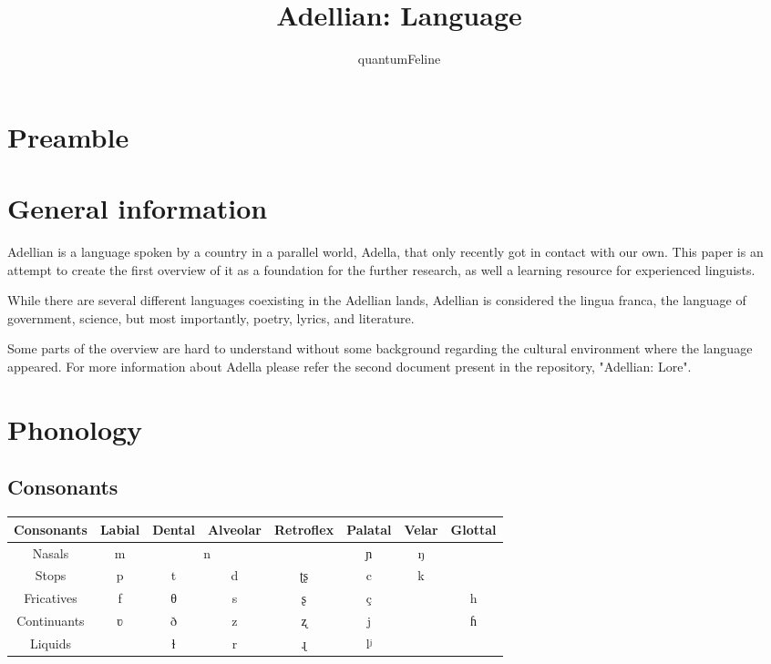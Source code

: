 \documentclass[12pt]{article}
\begin{document}
	\title{Adellian: Language}
	\author{quantumFeline}
	\maketitle

	\section{Preamble}

	\tableofcontents

	\section{General information}
	
	Adellian is a language spoken by a country in a parallel world, Adella, that only recently got in contact with our own. This paper is an attempt to create the first overview of it as a foundation for the further research, as well a learning resource for experienced linguists. 
	
	While there are several different languages coexisting in the Adellian lands, Adellian is considered the lingua franca, the language of government, science, but most importantly, poetry, lyrics, and literature.
	
	Some parts of the overview are hard to understand without some background regarding the cultural environment where the language appeared. For more information about Adella please refer the second document present in the repository, "Adellian: Lore".

	\section{Phonology}

	\subsection{Consonants}

	\begin{tabular}{||c | c c c c c c c||}
		\hline
		Consonants & Labial & Dental & Alveolar &
		Retroflex & Palatal & Velar & Glottal \\
		\hline
		Nasals & m & \multicolumn{2}{c}{n} & & ɲ & ŋ & \\
		Stops & p & t & d & ʈʂ & c & k & \\
		Fricatives & f & θ & s & ʂ & ç & & h \\
		Continuants & ʋ & ð & z & ʐ & j & & ɦ \\
		Liquids & & ɫ & r & ɻ & lʲ & & \\
		\hline
	\end{tabular}
\end{document}
